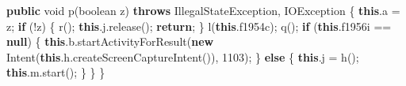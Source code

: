 \documentclass[
]{article}
\newenvironment{Shaded}{}{}
\newcommand{\BuiltInTok}[1]{\textcolor[rgb]{0.00,0.50,0.00}{#1}}
\newcommand{\ControlFlowTok}[1]{\textcolor[rgb]{0.00,0.44,0.13}{\textbf{#1}}}
\newcommand{\DataTypeTok}[1]{\textcolor[rgb]{0.56,0.13,0.00}{#1}}
\newcommand{\DecValTok}[1]{\textcolor[rgb]{0.25,0.63,0.44}{#1}}
\newcommand{\FunctionTok}[1]{\textcolor[rgb]{0.02,0.16,0.49}{#1}}
\newcommand{\KeywordTok}[1]{\textcolor[rgb]{0.00,0.44,0.13}{\textbf{#1}}}
\newcommand{\NormalTok}[1]{#1}
\newcommand{\OperatorTok}[1]{\textcolor[rgb]{0.40,0.40,0.40}{#1}}
\begin{document}
\begin{Shaded}
\begin{Highlighting}[]
    \KeywordTok{public} \DataTypeTok{void} \FunctionTok{p}\OperatorTok{(}\DataTypeTok{boolean}\NormalTok{ z}\OperatorTok{)} \KeywordTok{throws} \BuiltInTok{IllegalStateException}\OperatorTok{,} \BuiltInTok{IOException} \OperatorTok{\{}
        \KeywordTok{this}\OperatorTok{.}\FunctionTok{a} \OperatorTok{=}\NormalTok{ z}\OperatorTok{;}
        \ControlFlowTok{if} \OperatorTok{(!}\NormalTok{z}\OperatorTok{)} \OperatorTok{\{}
            \FunctionTok{r}\OperatorTok{();}
            \KeywordTok{this}\OperatorTok{.}\FunctionTok{j}\OperatorTok{.}\FunctionTok{release}\OperatorTok{();}
            \ControlFlowTok{return}\OperatorTok{;}
        \OperatorTok{\}}
        \FunctionTok{l}\OperatorTok{(}\KeywordTok{this}\OperatorTok{.}\FunctionTok{f1954c}\OperatorTok{);}
        \FunctionTok{q}\OperatorTok{();}
        \ControlFlowTok{if} \OperatorTok{(}\KeywordTok{this}\OperatorTok{.}\FunctionTok{f1956i} \OperatorTok{==} \KeywordTok{null}\OperatorTok{)} \OperatorTok{\{}
            \KeywordTok{this}\OperatorTok{.}\FunctionTok{b}\OperatorTok{.}\FunctionTok{startActivityForResult}\OperatorTok{(}\KeywordTok{new} \FunctionTok{Intent}\OperatorTok{(}\KeywordTok{this}\OperatorTok{.}\FunctionTok{h}\OperatorTok{.}\FunctionTok{createScreenCaptureIntent}\OperatorTok{()),} \DecValTok{1103}\OperatorTok{);}
        \OperatorTok{\}} \ControlFlowTok{else} \OperatorTok{\{}
            \KeywordTok{this}\OperatorTok{.}\FunctionTok{j} \OperatorTok{=} \FunctionTok{h}\OperatorTok{();}
            \KeywordTok{this}\OperatorTok{.}\FunctionTok{m}\OperatorTok{.}\FunctionTok{start}\OperatorTok{();}
        \OperatorTok{\}}
    \OperatorTok{\}}
\OperatorTok{\}}
\end{Highlighting}
\end{Shaded}
\end{document}
